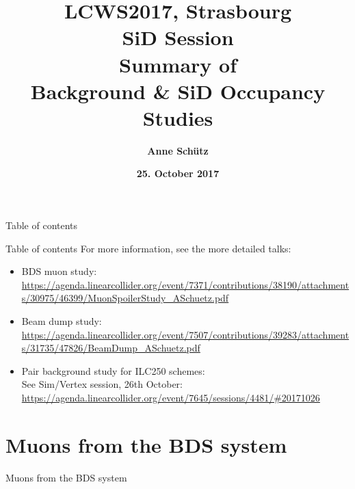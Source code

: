 \documentclass[xcolor={dvipsnames}]{beamer}
\title[ILC backgrounds \& SiD Occupancy]{\textbf{\alert{LCWS2017, Strasbourg\\SiD Session} \\ \vspace*{0.3cm} \LARGE  Summary of \\Background \& SiD Occupancy Studies}}
\author{\textbf{Anne Sch\"utz}}
\institute{\textbf{DESY}}
\date{\textbf{25. October 2017}}
\begin{document}
{
\begin{frame}
  \titlepage
\end{frame}
}
\setcounter{tocdepth}{2}
\begin{frame}{Table of contents}
  \tableofcontents
\end{frame}
\begin{frame}{Table of contents}
  For more information, see the more detailed talks:
  \begin{itemize}
   \item \alert{BDS muon study}:\\
   {\small
   \url{https://agenda.linearcollider.org/event/7371/contributions/38190/attachments/30975/46399/MuonSpoilerStudy_ASchuetz.pdf}
   }
   \item \alert{Beam dump study}:\\
   {\small
   \url{https://agenda.linearcollider.org/event/7507/contributions/39283/attachments/31735/47826/BeamDump_ASchuetz.pdf}
   }
   \item \alert{Pair background study for ILC250 schemes}:\\
   {\small
   See Sim/Vertex session, 26th October:\\
   \url{https://agenda.linearcollider.org/event/7645/sessions/4481/\#20171026}
   }
  \end{itemize}
\end{frame}


\section{Muons from the BDS system}
\begin{frame}
 \begin{center}
  {\LARGE Muons from the BDS system}
 \end{center}
\end{frame}
\end{document}
